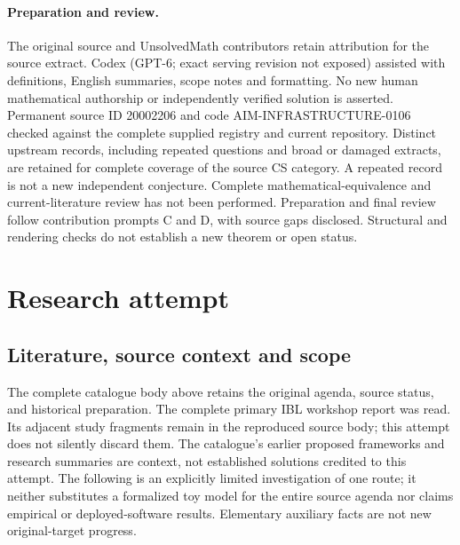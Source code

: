 \documentclass[11pt]{article}
\begin{document}
\paragraph{Preparation and review.}
The original source and UnsolvedMath contributors retain attribution for the source extract. Codex (GPT-6; exact serving revision not exposed) assisted with definitions, English summaries, scope notes and formatting. No new human mathematical authorship or independently verified solution is asserted. Permanent source ID 20002206 and code AIM-INFRASTRUCTURE-0106 checked against the complete supplied registry and current repository. Distinct upstream records, including repeated questions and broad or damaged extracts, are retained for complete coverage of the source CS category. A repeated record is not a new independent conjecture. Complete mathematical-equivalence and current-literature review has not been performed. Preparation and final review follow contribution prompts C and D, with source gaps disclosed. Structural and rendering checks do not establish a new theorem or open status.
\label{end:20002206}

\section{Research attempt}
\subsection{Literature, source context and scope}
The complete catalogue body above retains the original agenda, source status, and historical preparation. The complete primary IBL workshop report was read. Its adjacent study fragments remain in the reproduced source body; this attempt does not silently discard them. The catalogue's earlier proposed frameworks and research summaries are context, not established solutions credited to this attempt. The following is an explicitly limited investigation of one route; it neither substitutes a formalized toy model for the entire source agenda nor claims empirical or deployed-software results. Elementary auxiliary facts are not new original-target progress.
\end{document}
